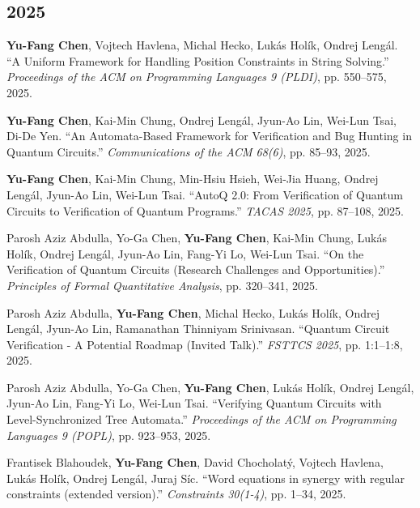 \documentclass[10.5pt,a4paper]{article}
\begin{document}
\subsection*{2025}
\begin{enumerate}[leftmargin=*,label={[\arabic*]},resume]
\item \textbf{Yu-Fang Chen}, Vojtech Havlena, Michal Hecko, Lukás Holík, Ondrej Lengál. ``A Uniform Framework for Handling Position Constraints in String Solving.'' \emph{Proceedings of the ACM on Programming Languages 9 (PLDI)}, pp. 550--575, 2025.
\item \textbf{Yu-Fang Chen}, Kai-Min Chung, Ondrej Lengál, Jyun-Ao Lin, Wei-Lun Tsai, Di-De Yen. ``An Automata-Based Framework for Verification and Bug Hunting in Quantum Circuits.'' \emph{Communications of the ACM 68(6)}, pp. 85--93, 2025.
\item \textbf{Yu-Fang Chen}, Kai-Min Chung, Min-Hsiu Hsieh, Wei-Jia Huang, Ondrej Lengál, Jyun-Ao Lin, Wei-Lun Tsai. ``AutoQ 2.0: From Verification of Quantum Circuits to Verification of Quantum Programs.'' \emph{TACAS 2025}, pp. 87--108, 2025.
\item Parosh Aziz Abdulla, Yo-Ga Chen, \textbf{Yu-Fang Chen}, Kai-Min Chung, Lukás Holík, Ondrej Lengál, Jyun-Ao Lin, Fang-Yi Lo, Wei-Lun Tsai. ``On the Verification of Quantum Circuits (Research Challenges and Opportunities).'' \emph{Principles of Formal Quantitative Analysis}, pp. 320--341, 2025.
\item Parosh Aziz Abdulla, \textbf{Yu-Fang Chen}, Michal Hecko, Lukás Holík, Ondrej Lengál, Jyun-Ao Lin, Ramanathan Thinniyam Srinivasan. ``Quantum Circuit Verification - A Potential Roadmap (Invited Talk).'' \emph{FSTTCS 2025}, pp. 1:1--1:8, 2025.
\item Parosh Aziz Abdulla, Yo-Ga Chen, \textbf{Yu-Fang Chen}, Lukás Holík, Ondrej Lengál, Jyun-Ao Lin, Fang-Yi Lo, Wei-Lun Tsai. ``Verifying Quantum Circuits with Level-Synchronized Tree Automata.'' \emph{Proceedings of the ACM on Programming Languages 9 (POPL)}, pp. 923--953, 2025.
\item Frantisek Blahoudek, \textbf{Yu-Fang Chen}, David Chocholatý, Vojtech Havlena, Lukás Holík, Ondrej Lengál, Juraj Síc. ``Word equations in synergy with regular constraints (extended version).'' \emph{Constraints 30(1-4)}, pp. 1--34, 2025.
\end{enumerate}
\end{document}
